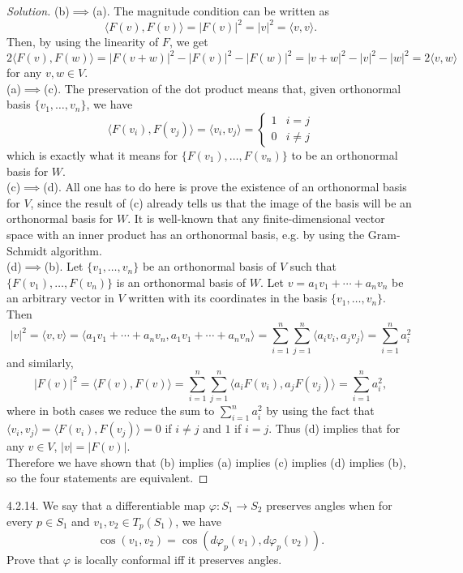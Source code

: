 \documentclass[10pt]{scrartcl}
\newenvironment{soln}{\begin{proof}[Solution]}{\end{proof}}
\begin{document}
\begin{soln}
	(b)$\implies$(a). The magnitude condition can be written as
	\[\langle F(v),F(v)\rangle = |F(v)|^2 = |v|^2 = \langle v,v\rangle.\]
	Then, by using the linearity of $F$, we get
	\[2\langle F(v),F(w)\rangle
	= |F(v+w)|^2 - |F(v)|^2 - |F(w)|^2
	= |v+w|^2 - |v|^2 - |w|^2
	= 2\langle v,w\rangle\]
	for any $v,w\in V$.\\
	
	(a)$\implies$(c). The preservation of the dot product means that,
	given orthonormal basis $\{v_1,\dots,v_n\}$, we have
	\[\langle F(v_i),F(v_j)\rangle
	= \langle v_i,v_j\rangle = \begin{cases}
		1 & i=j\\
		0 & i\ne j
	\end{cases}\]
	which is exactly what it means for $\{F(v_1),\dots,F(v_n)\}$
	to be an orthonormal basis for $W$.\\
	
	(c)$\implies$(d). All one has to do here is prove the existence
	of an orthonormal basis for $V$, since the result of (c) already tells us
	that the image of the basis will be an orthonormal basis for $W$.
	It is well-known that any finite-dimensional vector space
	with an inner product has an orthonormal basis,
	e.g. by using the Gram-Schmidt algorithm.\\
	
	(d)$\implies$(b). Let $\{v_1,\dots,v_n\}$ be an orthonormal basis of $V$
	such that $\{F(v_1),\dots,F(v_n)\}$ is an orthonormal basis of $W$.
	Let $v = a_1v_1 + \cdots + a_nv_n$ be an arbitrary vector in $V$
	written with its coordinates in the basis $\{v_1,\dots,v_n\}$. Then
	\[|v|^2 = \langle v,v\rangle = \langle a_1v_1 + \cdots + a_nv_n,
	a_1v_1+\cdots+a_nv_n\rangle =\sum_{i=1}^n \sum_{j=1}^n
	\langle a_iv_i, a_jv_j\rangle = \sum_{i=1}^n a_i^2\]
	and similarly,
	\[|F(v)|^2 = \langle F(v),F(v)\rangle =
	\sum_{i=1}^n \sum_{j=1}^n
	\langle a_iF(v_i), a_jF(v_j)\rangle = \sum_{i=1}^n a_i^2,\]
	where in both cases we reduce the sum to $\sum_{i=1}^n a_i^2$
	by using the fact that
	$\langle v_i,v_j\rangle = \langle F(v_i),F(v_j)\rangle = 0$
	if $i\ne j$ and $1$ if $i=j$. Thus (d) implies that
	for any $v\in V$, $|v| = |F(v)|$.\\
	
	Therefore we have shown that (b) implies (a) implies
	(c) implies (d) implies (b), so the four statements are equivalent.
\end{soln}

\begin{problem*}4.2.14.
	We say that a differentiable map $\varphi\colon S_1\to S_2$ preserves angles
	when for every $p\in S_1$ and $v_1,v_2\in T_p(S_1)$, we have
	\[\cos(v_1,v_2) = \cos(d\varphi_p(v_1),d\varphi_p(v_2)).\]
	Prove that $\varphi$ is locally conformal iff it preserves angles.
\end{problem*}
\end{document}
